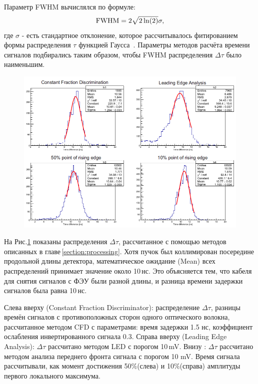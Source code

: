 Параметр FWHM вычислялся по формуле:
\begin{equation}
\label{FWHM}
{\rm FWHM}=2\sqrt{2\ln(2)}\sigma,
\end{equation}
где $\sigma$ - есть стандартное отклонение, которое рассчитывалось фитированием формы распределения $\tau$ функцией Гаусса~\cite{vratislav}. 
Параметры методов расчёта времени сигналов подбирались таким образом, чтобы FWHM распределения $\Delta\tau$ было наименьшим. 

\begin{figure}[!ht]
	\centering
	\includegraphics[width=1\linewidth]{tau.png}
	\label{ris:Tau}
\end{figure}

На Рис.\ref{ris:Tau} показаны распределения $\Delta\tau$, рассчитанное с помощью методов описанных в главе\,\ref{section:processing}. Хотя пучок был коллимирован посередине продольной длины детектора, математическое ожидание (Mean) всех распределений принимает значение около 10\,нс. Это объясняется тем, что кабеля для снятия сигналов с ФЭУ были разной длины, и разница времени задержки сигналов была равна 10\,нс. 

Слева вверху (Constant Fraction Discriminator): распределение $\Delta\tau$, разницы времён сигналов с противоположных сторон одного оптического волокна, рассчитанное методом CFD с параметрами: время задержки 1.5 нс, коэффициент ослабления инвертированного сигнала  0.3.
Справа вверху (Leading Edge Analysis): $\Delta\tau$ рассчитано методом LED с порогом 10\,mV. 
Внизу : $\Delta\tau$ рассчитано методом анализа переднего фронта сигнала с порогом 10 mV. Время сигнала рассчитывали, как момент достижения 50\%(слева) и 10\%(справа) амплитуды первого локального максимума.
 
